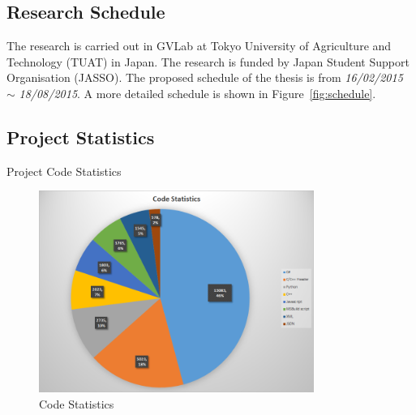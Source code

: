 \subsection{Research Schedule}
	The research is carried out in GVLab at Tokyo University of Agriculture and Technology (TUAT) in Japan. The research is funded by Japan Student Support Organisation (JASSO). The proposed schedule of the thesis is from \emph{16/02/2015} $\sim$ \emph{18/08/2015}. A more detailed schedule is shown in Figure~\ref{fig:schedule}.
	
\subsection{Project Statistics}

\begin{table}[h!]
  \begin{center}
    \caption{Project Code Statistics}
    \label{table:code_stats}
  \end{center}
\end{table}

\begin{figure}
\centering
\includegraphics[width=0.8\textwidth]{assets/code_statistics.png}
\caption{Code Statistics}
\label{fig:program}
\end{figure}  
